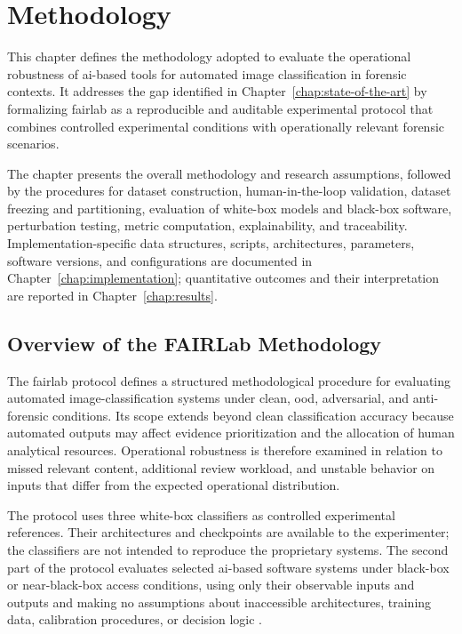 \chapter{Methodology}
\label{chap:methodology}

This chapter defines the methodology adopted to evaluate the operational
robustness of \gls{ai}-based tools for automated image classification in
forensic contexts. It addresses the gap identified in
Chapter~\ref{chap:state-of-the-art} by formalizing \gls{fairlab} as a
reproducible and auditable experimental protocol that combines controlled
experimental conditions with operationally relevant forensic scenarios.

The chapter presents the overall methodology and research assumptions, followed
by the procedures for dataset construction, human-in-the-loop validation,
dataset freezing and partitioning, evaluation of white-box models and
black-box software, perturbation testing, metric computation, explainability, and
traceability. Implementation-specific data structures, scripts, architectures,
parameters, software versions, and configurations are documented in
Chapter~\ref{chap:implementation}; quantitative outcomes and their
interpretation are reported in Chapter~\ref{chap:results}.

\section{Overview of the FAIRLab Methodology}
\label{sec:methodology-fairlab-overview}

The \gls{fairlab} protocol defines a structured methodological procedure for evaluating
automated image-classification systems under clean, \gls{ood}, adversarial,
and anti-forensic conditions. Its scope extends beyond clean classification
accuracy because automated outputs may affect evidence prioritization and the
allocation of human analytical resources. Operational robustness is therefore
examined in relation to missed relevant content, additional review workload,
and unstable behavior on inputs that differ from the expected operational
distribution.

The protocol uses three white-box classifiers as controlled experimental
references. Their architectures and checkpoints are available to the experimenter;
the classifiers are not intended to reproduce the proprietary systems.
The second part of the protocol evaluates selected
\gls{ai}-based software systems under black-box or near-black-box access
conditions, using only their observable inputs and outputs and making no
assumptions about inaccessible architectures, training data, calibration
procedures, or decision logic
\cite{sanna2024preliminary,sanna2025pixelperfect}.

